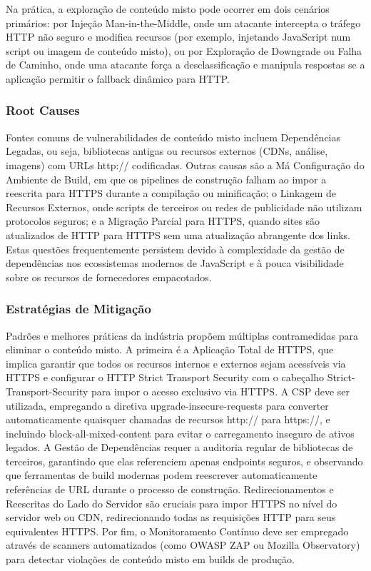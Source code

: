 Na prática, a exploração de conteúdo misto pode ocorrer em dois cenários primários: por Injeção Man-in-the-Middle, onde um atacante intercepta o tráfego HTTP não seguro e modifica recursos (por exemplo, injetando JavaScript num script ou imagem de conteúdo misto), ou por Exploração de Downgrade ou Falha de Caminho, onde uma atacante força a desclassificação e manipula respostas se a aplicação permitir o fallback dinâmico para HTTP. 

\subsubsection{Root Causes}

Fontes comuns de vulnerabilidades de conteúdo misto incluem Dependências Legadas, ou seja, bibliotecas antigas ou recursos externos (CDNs, análise, imagens) com URLs http:// codificadas. Outras causas são a Má Configuração do Ambiente de Build, em que os pipelines de construção falham ao impor a reescrita para HTTPS durante a compilação ou minificação; o Linkagem de Recursos Externos, onde scripts de terceiros ou redes de publicidade não utilizam protocolos seguros; e a Migração Parcial para HTTPS, quando sites são atualizados de HTTP para HTTPS sem uma atualização abrangente dos links. Estas questões frequentemente persistem devido à complexidade da gestão de dependências nos ecossistemas modernos de JavaScript e à pouca visibilidade sobre os recursos de fornecedores empacotados. \cite{ref49}

\subsubsection{Estratégias de Mitigação}

Padrões e melhores práticas da indústria propõem múltiplas contramedidas para eliminar o conteúdo misto. A primeira é a Aplicação Total de HTTPS, que implica garantir que todos os recursos internos e externos sejam acessíveis via HTTPS e configurar o HTTP Strict Transport Security com o cabeçalho Strict-Transport-Security para impor o acesso exclusivo via HTTPS. A CSP deve ser utilizada, empregando a diretiva upgrade-insecure-requests para converter automaticamente quaisquer chamadas de recursos http:// para https://, e incluindo block-all-mixed-content para evitar o carregamento inseguro de ativos legados. A Gestão de Dependências requer a auditoria regular de bibliotecas de terceiros, garantindo que elas referenciem apenas endpoints seguros, e observando que ferramentas de build modernas podem reescrever automaticamente referências de URL durante o processo de construção. Redirecionamentos e Reescritas do Lado do Servidor são cruciais para impor HTTPS no nível do servidor web ou CDN, redirecionando todas as requisições HTTP para seus equivalentes HTTPS. Por fim, o Monitoramento Contínuo deve ser empregado através de scanners automatizados (como OWASP ZAP ou Mozilla Observatory) para detectar violações de conteúdo misto em builds de produção. \cite{ref52}

